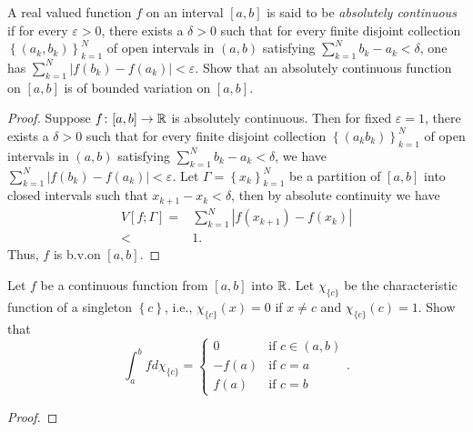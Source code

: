 \begin{problem}
A real valued function $f$ on an interval $[a,b]$ is said to be
\emph{absolutely continuous} if for every $\varepsilon>0$, there exists a
$\delta>0$ such that for every finite disjoint collection
$\left\{(a_k,b_k)\right\}_{k=1}^N$ of open intervals in $(a,b)$ satisfying
$\sum_{k=1}^Nb_k-a_k<\delta$, one has
$\sum_{k=1}^N\left|f(b_k)-f(a_k)\right|<\varepsilon$. Show that an
absolutely continuous function on $[a,b]$ is of bounded variation on
$[a,b]$.
\end{problem}
\begin{proof}
Suppose $f\colon[a,b]\to\mathbb{R}$ is absolutely continuous. Then for fixed
$\varepsilon=1$, there exists a $\delta>0$ such that for every finite
disjoint collection $\left\{ (a_kb_k) \right\}_{k=1}^N$ of open intervals
in $(a,b)$ satisfying $\sum_{k=1}^Nb_k-a_k<\delta$, we have
$\sum_{k=1}^N\left|f(b_k)-f(a_k)\right|<\varepsilon$. Let
$\Gamma=\left\{x_k\right\}_{k=1}^N$ be a partition of $[a,b]$ into closed
intervals such that $x_{k+1}-x_k<\delta$, then by absolute continuity we have
\begin{equation}
\label{eq:absolute-continuity-variation}
\begin{aligned}
V[f;\Gamma]
={}&\sum_{k=1}^N\left|f(x_{k+1})-f(x_k)\right|\\
<{}&1.
\end{aligned}
\end{equation}
Thus, $f$ is b.v.\@ on $[a,b]$.
\end{proof}

\begin{problem}
Let $f$ be a continuous function from $[a,b]$ into $\mathbb{R}$. Let
$\chi_{\{c\}}$ be the characteristic function of a singleton
$\left\{c\right\}$, i.e., $\chi_{\{c\}}(x)=0$ if $x\neq c$ and
$\chi_{\{c\}}(c)=1$. Show that
\[
\int_a^b f d \chi_{\{c\}}=
\begin{cases}
0&\text{if $c\in(a,b)$}\\
-f(a)&\text{if $c=a$}\\
f(a)&\text{if $c=b$}
\end{cases}.
\]
\end{problem}
\begin{proof}
\end{proof}

